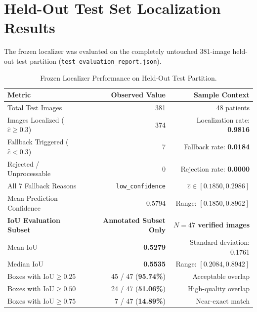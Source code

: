 \documentclass[11pt,a4paper]{report}
\newcommand{\artifact}[1]{\texttt{\footnotesize #1}}
\begin{document}
\section{Held-Out Test Set Localization Results}
The frozen localizer was evaluated on the completely untouched 381-image held-out test partition (\artifact{test\_evaluation\_report.json}).
\begin{table}[H]
\centering
\small
\begin{tabular}{lrr}
\toprule
\textbf{Metric} & \textbf{Observed Value} & \textbf{Sample Context} \\
\midrule
Total Test Images & 381 & 48 patients \\
Images Localized ($\hat{c} \ge 0.3$) & 374 & Localization rate: \textbf{0.9816} \\
Fallback Triggered ($\hat{c} < 0.3$) & 7 & Fallback rate: \textbf{0.0184} \\
Rejected / Unprocessable & 0 & Rejection rate: \textbf{0.0000} \\
All 7 Fallback Reasons & \texttt{low\_confidence} & $\hat{c} \in [0.1850, 0.2986]$ \\
Mean Prediction Confidence & 0.5794 & Range: $[0.1850, 0.8962]$ \\
\midrule
\textbf{IoU Evaluation Subset} & \textbf{Annotated Subset Only} & \textbf{$N = 47$ verified images} \\
Mean IoU & \textbf{0.5279} & Standard deviation: 0.1761 \\
Median IoU & \textbf{0.5535} & Range: $[0.2084, 0.8942]$ \\
Boxes with $\text{IoU} \ge 0.25$ & 45 / 47 (\textbf{95.74\%}) & Acceptable overlap \\
Boxes with $\text{IoU} \ge 0.50$ & 24 / 47 (\textbf{51.06\%}) & High-quality overlap \\
Boxes with $\text{IoU} \ge 0.75$ & 7 / 47 (\textbf{14.89\%}) & Near-exact match \\
\bottomrule
\end{tabular}
\caption{Frozen Localizer Performance on Held-Out Test Partition.}
\label{tab:localizer_test}
\end{table}
\end{document}
